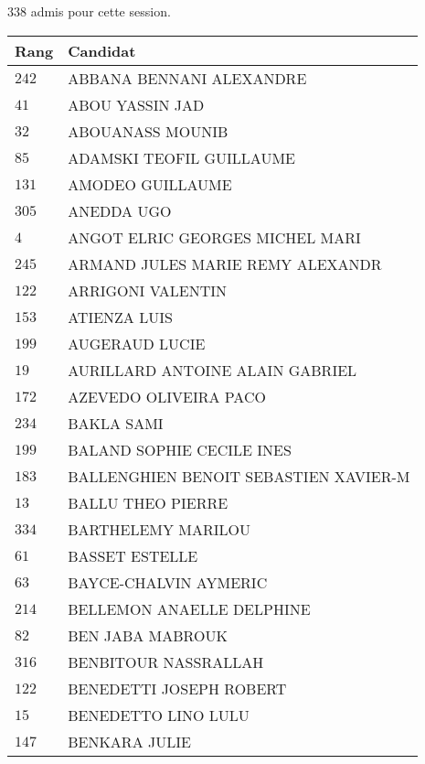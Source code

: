 




  $338$ admis pour cette session.

  \begin{xltabular}{\linewidth}{|l|X|}
    \hline
    \textbf{Rang} & \textbf{Candidat} \\
    \hline
    $242$ & ABBANA BENNANI ALEXANDRE \\
    \hline
    $41$ & ABOU YASSIN JAD \\
    \hline
    $32$ & ABOUANASS MOUNIB \\
    \hline
    $85$ & ADAMSKI TEOFIL GUILLAUME \\
    \hline
    $131$ & AMODEO GUILLAUME \\
    \hline
    $305$ & ANEDDA UGO \\
    \hline
    $4$ & ANGOT ELRIC GEORGES MICHEL MARI \\
    \hline
    $245$ & ARMAND JULES MARIE REMY ALEXANDR \\
    \hline
    $122$ & ARRIGONI VALENTIN \\
    \hline
    $153$ & ATIENZA LUIS \\
    \hline
    $199$ & AUGERAUD LUCIE \\
    \hline
    $19$ & AURILLARD ANTOINE ALAIN GABRIEL \\
    \hline
    $172$ & AZEVEDO OLIVEIRA PACO \\
    \hline
    $234$ & BAKLA SAMI \\
    \hline
    $199$ & BALAND SOPHIE CECILE INES \\
    \hline
    $183$ & BALLENGHIEN BENOIT SEBASTIEN XAVIER-M \\
    \hline
    $13$ & BALLU THEO PIERRE \\
    \hline
    $334$ & BARTHELEMY MARILOU \\
    \hline
    $61$ & BASSET ESTELLE \\
    \hline
    $63$ & BAYCE-CHALVIN AYMERIC \\
    \hline
    $214$ & BELLEMON ANAELLE DELPHINE \\
    \hline
    $82$ & BEN JABA MABROUK \\
    \hline
    $316$ & BENBITOUR NASSRALLAH \\
    \hline
    $122$ & BENEDETTI JOSEPH ROBERT \\
    \hline
    $15$ & BENEDETTO LINO LULU \\
    \hline
    $147$ & BENKARA JULIE \\

\end{xltabular}
